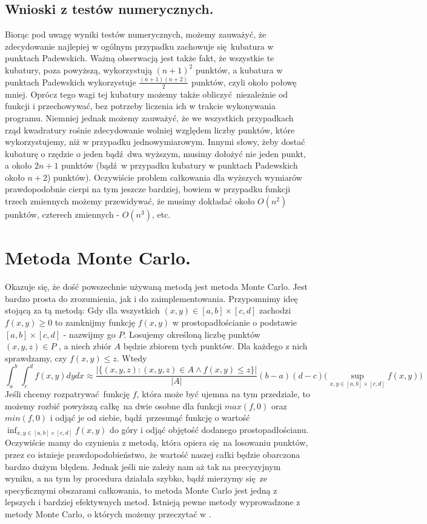 \documentclass[10pt,wide]{mwart}
\theoremstyle{definition}
\begin{document}
\subsection{Wnioski z testów numerycznych.}
Biorąc pod uwagę wyniki testów numerycznych, możemy zauważyć, że zdecydowanie najlepiej w ogólnym przypadku zachowuje się kubatura w punktach Padewskich.
Ważną obserwacją jest także fakt, że wszystkie te kubatury, poza powyższą, wykorzystują \((n+1)^2\) punktów,
a kubatura w punktach Padewskich wykorzystuje \(\frac{(n+1)(n+2)}{2}\) punktów, czyli około połowę mniej.
Oprócz tego wagi tej kubatury możemy także obliczyć niezależnie od funkcji i przechowywać, bez potrzeby liczenia ich w trakcie wykonywania programu.
Niemniej jednak możemy zauważyć, że we wszystkich przypadkach rząd kwadratury rośnie zdecydowanie wolniej względem liczby punktów, które wykorzystujemy, niż w przypadku jednowymiarowym.
Innymi słowy, żeby dostać kubaturę o rzędzie o jeden bądź dwa wyższym, musimy dołożyć nie jeden punkt, a około \(2n+1\) punktów (bądź w przypadku kubatury w punktach Padewskich około \(n+2\)) punktów).
Oczywiście problem całkowania dla wyższych wymiarów prawdopodobnie cierpi na tym jeszcze bardziej, bowiem w przypadku funkcji trzech zmiennych możemy przewidywać, że musimy dokładać około \(O(n^2)\) punktów, czterech zmiennych - \(O(n^3)\), etc.

\section{Metoda Monte Carlo.}
Okazuje się, że dość powszechnie używaną metodą jest metoda Monte Carlo.
Jest bardzo prosta do zrozumienia, jak i do zaimplementowania.
Przypomnimy ideę stojącą za tą metodą: Gdy dla wszystkich \((x,y) \in [a,b]\times[c,d]\) zachodzi \(f(x,y) \geq 0 \) to zamknijmy funkcję \(f(x,y)\) w prostopadłościanie o podstawie \([a,b] \times [c,d]\) - nazwijmy go \(P\). Losujemy określoną liczbę punktów \((x,y,z) \in P\) ,
a niech zbiór \(A\) będzie zbiorem tych punktów. Dla każdego z nich sprawdzamy, czy \(f(x,y) \leq z\).
Wtedy \begin{equation}
  \int_a^b \int_c^d f(x,y) dy dx \approx \frac{|\{(x,y,z): (x,y,z) \in A \wedge f(x,y) \leq z\}|}{|A|}(b-a)(d-c)\Bigg(\sup_{x,y \in [a,b]\times [c,d]} f(x,y)\Bigg)
\end{equation}
Jeśli chcemy rozpatrywać funkcję \(f\), która może być ujemna na tym przedziale, to możemy rozbić powyższą całkę na dwie osobne dla funkcji \(max(f,0)\) oraz \(min(f,0)\) i odjąć je od siebie, bądź przesunąć funkcję o wartość \(\inf_{x,y \in [a,b]\times [c,d]} f(x,y)\) do góry i odjąć objętość dodanego prostopadłościanu.
Oczywiście mamy do czynienia z metodą, która opiera się na losowaniu punktów, przez co istnieje prawdopodobieństwo, że wartość naszej całki będzie obarczona bardzo dużym błędem.
Jednak jeśli nie zależy nam aż tak na precyzyjnym wyniku, a na tym by procedura działała szybko, bądź mierzymy się ze specyficznymi obszarami całkowania, to metoda Monte Carlo jest jedną z lepszych i bardziej efektywnych metod.
Istnieją pewne metody wyprowadzone z metody Monte Carlo, o których możemy przeczytać w \cite{JDFKIS}.
\end{document}
